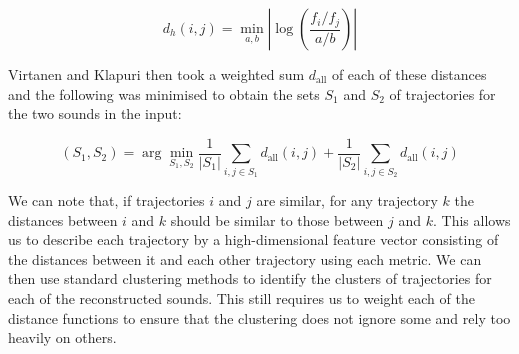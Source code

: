 \documentclass[12pt,a4paper,twoside,openright]{report}
\begin{document}
\begin{equation}
d_h(i,j) = \min_{a, b} \left| \log \left( \frac{f_i/f_j}{a/b} \right) \right|
\label{sinDh}
\end{equation}

{\color{red}Virtanen and Klapuri then took a weighted sum $ d_{\mathrm{all}} $ of each of these distances and the following was minimised to obtain the sets $ S_1 $ and $ S_2 $ of trajectories for the two sounds in the input:}

\begin{equation}
(S_1, S_2) = \arg\min_{S_1, S_2} \frac{1}{|S_1|} \sum_{i, j \in S_1} d_{\mathrm{all}}(i,j) + \frac{1}{|S_2|} \sum_{i, j \in S_2} d_{\mathrm{all}}(i,j)
\end{equation}


We can note that, if trajectories $ i $ and $ j $ are similar, for any trajectory $ k $ the distances between $ i $ and $ k $ should be similar to those between $ j $ and $ k $. This allows us to describe each trajectory by a high-dimensional feature vector consisting of the distances between it and each other trajectory using each metric. We can then use standard clustering methods to identify the clusters of trajectories for each of the reconstructed sounds. This still requires us to weight each of the distance functions to ensure that the clustering does not ignore some and rely too heavily on others.
\end{document}
